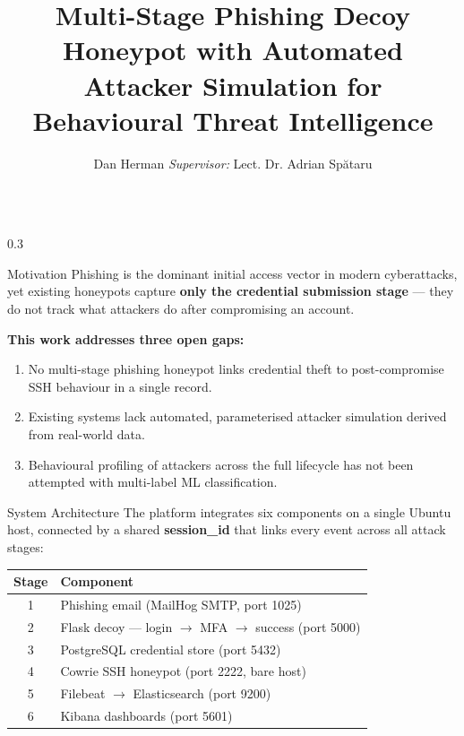 \documentclass[final]{beamer}
\title{Multi-Stage Phishing Decoy Honeypot with Automated\\Attacker Simulation for Behavioural Threat Intelligence}
\author{Dan Herman \quad \textit{Supervisor:} Lect. Dr. Adrian Spătaru}
\institute[UVT]{Faculty of Computer Science, West University of Timișoara}
\begin{document}
\begin{frame}[fragile]
\begin{columns}[t]

\separatorcolumn

\begin{column}{0.3\paperwidth}

\begin{block}{Motivation}
Phishing is the dominant initial access vector in modern cyberattacks,
yet existing honeypots capture \textbf{only the credential submission stage}
— they do not track what attackers do after compromising an account.

\bigskip
\textbf{This work addresses three open gaps:}
\begin{enumerate}
    \item No multi-stage phishing honeypot links credential theft to
          post-compromise SSH behaviour in a single record.
    \item Existing systems lack automated, parameterised attacker
          simulation derived from real-world data.
    \item Behavioural profiling of attackers across the full lifecycle
          has not been attempted with multi-label ML classification.
\end{enumerate}
\end{block}

\begin{block}{System Architecture}
The platform integrates six components on a single Ubuntu host,
connected by a shared \textcolor{UVTLightBlue}{\textbf{session\_id}}
that links every event across all attack stages:

\bigskip
\begin{center}
\begin{tabular}{cl}
\toprule
\textbf{Stage} & \textbf{Component} \\
\midrule
1 & Phishing email (MailHog SMTP, port 1025) \\
2 & Flask decoy — login $\to$ MFA $\to$ success (port 5000) \\
3 & PostgreSQL credential store (port 5432) \\
4 & Cowrie SSH honeypot (port 2222, bare host) \\
5 & Filebeat $\to$ Elasticsearch (port 9200) \\
6 & Kibana dashboards (port 5601) \\
\bottomrule
\end{tabular}
\end{center}


\end{block}
\end{column}
\end{columns}
\end{frame}
\end{document}
